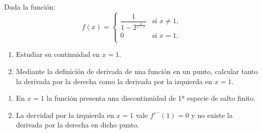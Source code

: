 {Dada la función:
\[
\renewcommand{\arraystretch}{2}
f(x)=
\begin{cases}
\dfrac{1}{1 - 2^\frac{x}{1-x}} & \mbox{si $x\ne 1$,} \\
0 & \mbox{si $x = 1$.} \\
\end{cases}
\]
\begin{enumerate}
\item Estudiar su continuidad en $x=1$.
\item Mediante la definición de derivada de una función en un punto, calcular tanto la derivada por la derecha como la derivada por la izquierda en $x=1$.
\end{enumerate}
}
{\begin{enumerate}
\item En $x=1$ la función presenta una discontinuidad de 1ª especie de salto finito.
\item La dervidad por la izquierda en $x=1$ vale $f'^-(1)=0$ y no existe la derivada por la derecha en dicho punto.
\end{enumerate}
}
